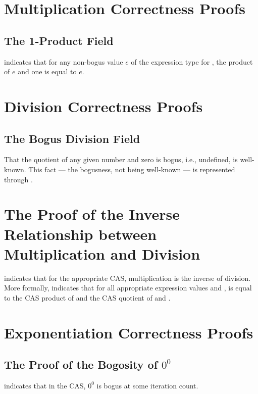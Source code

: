 \documentclass{report}
\begin{document}
\section{Multiplication Correctness Proofs}

\subsection{The 1-Product Field}
  indicates that for any non-bogus value \(e\) of the expression type for , the product of \(e\) and one is equal to \(e\).

\section{Division Correctness Proofs}

\subsection{The Bogus Division Field}
That the quotient of any given number and zero is bogus, i.e., undefined, is well-known.  This fact --- the bogusness, not being well-known --- is represented through .

\section{The Proof of the Inverse Relationship between Multiplication and Division}
 indicates that for the appropriate CAS, multiplication is the inverse of division.  More formally,   indicates that for all appropriate expression values  and ,  is equal to the  CAS product of  and the  CAS quotient of  and .

\section{Exponentiation Correctness Proofs}

\subsection{The Proof of the Bogosity of \(0^0\)}
  indicates that in the  CAS, \(0^0\) is bogus at some iteration count.
\end{document}

